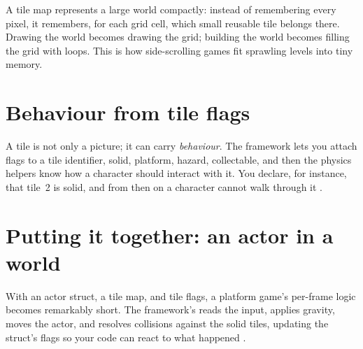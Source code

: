 

\begin{prgconcept}
A tile map represents a large world compactly: instead of remembering every pixel,
it remembers, for each grid cell, which small reusable tile belongs there. Drawing
the world becomes drawing the grid; building the world becomes filling the grid
with loops. This is how side-scrolling games fit sprawling levels into tiny
memory.
\end{prgconcept}

\section{Behaviour from tile flags}

A tile is not only a picture; it can carry \emph{behaviour}. The framework lets you
attach flags to a tile identifier, solid, platform, hazard, collectable, and then
the physics helpers know how a character should interact with it. You declare, for
instance, that tile~2 is solid, and from then on a character cannot walk through
it \citep{prg32repo}.



\section{Putting it together: an actor in a world}

With an actor struct, a tile map, and tile flags, a platform game's per-frame
logic becomes remarkably short. The framework's 
reads the input, applies gravity, moves the actor, and resolves collisions against
the solid tiles, updating the struct's  flags so your code can react
to what happened \citep{prg32repo,prg32tutorialc}.



